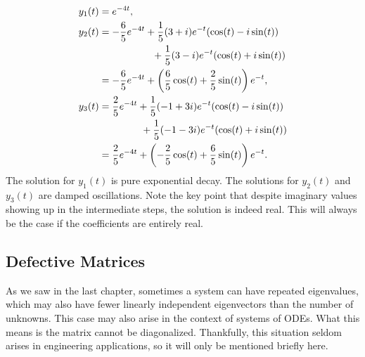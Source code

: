 \begin{subequations}
\begin{align}
  y_1(t) &= e^{-4t}, \\
  y_2(t) &= -\frac{6}{5} e^{-4t} + \frac{1}{5} ( 3 + i ) e^{-t} ( \cos(t) - i \sin(t) ) \nonumber \\ &\hspace{1.9cm} + \frac{1}{5} ( 3 - i ) e^{-t} ( \cos(t) + i \sin(t) ) \nonumber \\*
         &= -\frac{6}{5} e^{-4t} + \left( \frac{6}{5} \cos(t) + \frac{2}{5} \sin(t) \right) e^{-t}, \\
  y_3(t) &=  \frac{2}{5} e^{-4t} + \frac{1}{5} (-1 + 3i) e^{-t} ( \cos(t) - i \sin(t) ) \nonumber \\ &\hspace{1.5cm} + \frac{1}{5} (-1 - 3i) e^{-t} ( \cos(t) + i \sin(t) ) \nonumber \\*
         &=  \frac{2}{5} e^{-4t} + \left( -\frac{2}{5} \cos(t) + \frac{6}{5} \sin(t) \right) e^{-t}.
\end{align}
\end{subequations}
The solution for $y_1(t)$ is pure exponential decay. The solutions for $y_2(t)$ and $y_3(t)$ are damped oscillations. Note the key point that despite imaginary values showing up in the intermediate steps, the solution is indeed real. This will always be the case if the coefficients are entirely real.

\subsection{Defective Matrices}

As we saw in the last chapter, sometimes a system can have repeated eigenvalues, which may also have fewer linearly independent eigenvectors than the number of unknowns. This case may also arise in the context of systems of ODEs. What this means is the matrix cannot be diagonalized. Thankfully, this situation seldom arises in engineering applications, so it will only be mentioned briefly here.

